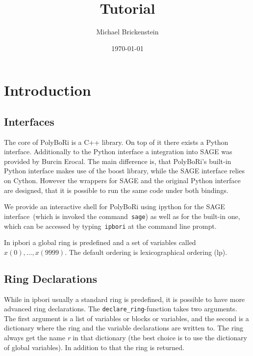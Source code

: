 \documentclass[]{article}
\title{\PolyBoRi Tutorial}
\author{Michael Brickenstein}
\date{\today}
\newcommand{\PolyBoRi}{{\sc PolyBoRi}\xspace}
\newcommand{\functionname}[1]{\textit{#1}\xspace}
\begin{document}
\ifpdf
{}
\else
{}
\fi

\maketitle
\newcommand{\Singular}{{\sc Singular}}



\section{Introduction}
\subsection{Interfaces}
The core of \PolyBoRi is a C++ library. On top of it there exists a Python interface.
Additionally to the Python interface a integration into SAGE was provided by Burcin Erocal.
The main difference is, that \PolyBoRi's built-in Python interface makes use of
the boost library, while the SAGE interface relies on Cython. 
However the wrappers for SAGE and the original Python interface are designed, that it is possible to run the same code under both bindings.

We provide an interactive shell for \PolyBoRi using ipython for the SAGE
interface~(which is invoked the command~\texttt{sage}) as well as for the
built-in one, which can be accessed by typing~\texttt{ipbori}
at the command line prompt.


In ipbori a global ring is predefined and a set of variables called  $x(0), \ldots, x(9999)$. The default ordering is lexicographical ordering (lp).

\subsection{Ring Declarations}
While in ipbori usually a standard ring is predefined,
it is possible to have more advanced ring declarations.
The \verb|declare_ring|-function takes two arguments.
The first argument is a list of variables or blocks or variables, and the second is a dictionary where the ring and the variable declarations are written to. The ring always get the name \functionname{r} in that dictionary (the best choice is to use the dictionary of global variables). In addition to that the ring is returned.
\end{document}
